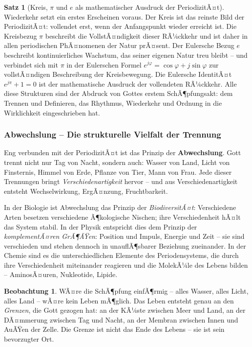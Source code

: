 ﻿\documentclass[a4paper,12pt]{article}
\theoremstyle{definition}
\newtheorem{theorem}{Satz}[section]
\newtheorem{observation}{Beobachtung}[section]
\begin{document}
\begin{theorem}[Kreis, $\pi$ und $e$ als mathematischer Ausdruck der PeriodizitÃ¤t]
	Wiederkehr setzt ein erstes Erscheinen voraus. Der Kreis ist das reinste Bild
	der PeriodizitÃ¤t: vollendet erst, wenn der Anfangspunkt wieder erreicht ist.
	Die Kreisbezug $\pi$ beschreibt die VollstÃ¤ndigkeit dieser RÃ¼ckkehr und ist
	daher in allen periodischen PhÃ¤nomenen der Natur prÃ¤sent. Der Eulersche Bezug
	$e$ beschreibt kontinuierliches Wachstum, das seiner eigenen Natur treu bleibt
	-- und verbindet sich mit $\pi$ in der Eulerschen Formel $e^{j\varphi} =
	\cos\varphi + j\sin\varphi$ zur vollstÃ¤ndigen Beschreibung der Kreisbewegung.
	Die Eulersche IdentitÃ¤t $e^{j\pi} + 1 = 0$ ist der mathematische Ausdruck
	der vollendeten RÃ¼ckkehr. Alle diese Strukturen sind der Abdruck von Gottes
	erstem SchÃ¶pfungsakt: dem Trennen und Definieren, das Rhythmus, Wiederkehr
	und Ordnung in die Wirklichkeit eingeschrieben hat.
\end{theorem}

\subsubsection{Abwechslung -- Die strukturelle Vielfalt der Trennung}

Eng verbunden mit der PeriodizitÃ¤t ist das Prinzip der \textbf{Abwechslung}. Gott
trennt nicht nur Tag von Nacht, sondern auch: Wasser von Land, Licht von Finsternis,
Himmel von Erde, Pflanze von Tier, Mann von Frau. Jede dieser Trennungen bringt
\textit{Verschiedenartigkeit} hervor -- und aus Verschiedenartigkeit entsteht
Wechselwirkung, ErgÃ¤nzung, Fruchtbarkeit.

In der Biologie ist Abwechslung das Prinzip der \textit{BiodiversitÃ¤t}: Verschiedene
Arten besetzen verschiedene Ã¶kologische Nischen; ihre Verschiedenheit hÃ¤lt das
System stabil. In der Physik entspricht dies dem Prinzip der \textit{komplementÃ¤ren
	GrÃ¶ÃŸen}: Position und Impuls, Energie und Zeit -- sie sind verschieden und stehen
dennoch in unauflÃ¶sbarer Beziehung zueinander. In der Chemie sind es die
unterschiedlichen Elemente des Periodensystems, die durch ihre Verschiedenheit
miteinander reagieren und die MolekÃ¼le des Lebens bilden -- AminosÃ¤uren, Nukleotide,
Lipide.

\begin{observation}
	WÃ¤re die SchÃ¶pfung einfÃ¶rmig -- alles Wasser, alles Licht, alles Land --
	wÃ¤re kein Leben mÃ¶glich. Das Leben entsteht genau an den \textit{Grenzen}, die
	Gott gezogen hat: an der KÃ¼ste zwischen Meer und Land, an der DÃ¤mmerung zwischen
	Tag und Nacht, an der Membran zwischen Innen und AuÃŸen der Zelle. Die Grenze
	ist nicht das Ende des Lebens -- sie ist sein bevorzugter Ort.
\end{observation}
\end{document}

